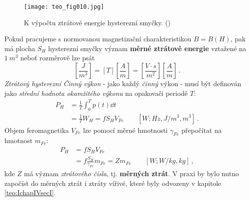       \begin{figure}[ht!] %
        \centering
        \texttt{[image: teo\_fig010.jpg]}
        \caption{K výpočtu ztrátové energie hysterezní smyčky.
                 (\cite[s.~159]{Patocka4})}
        \label{teo:fig010}
      \end{figure}
      
      Pokud pracujeme s normovanou magnetizační charakteristikou \(B = B(H)\), pak má plocha 
      \(S_H\) hysterezní smyčky význam \textbf{měrné ztrátově energie} vztažené na \(\qty{1}{m^3}\) 
      neboť rozměrově lze psát
      \begin{equation*}
        \left[\frac{J}{m^3}\right] = [T]\left[\frac{A}{m}\right] 
                                   = \left[\frac{V\cdot s}{m^2}\right]\left[\frac{A}{m}\right] \,.
      \end{equation*}
      \emph{Ztrátový hysterezní Činný výkon} - jako každý \emph{činný} výkon - musí být definován 
      jako \emph{střední hodnota okamžitého výkonu} na opakovači periodě \(T\): 
      \begin{align}\label{TEO:eq041}
        P_H &= \frac{1}{T}\int_0^Tp(t)\dd{t}          \nonumber \\
            &= \frac{1}{T}W_H = fS_HV_{Fe}
               \qquad[W;Hz, J/m^3, m^3]\,.
      \end{align}
      Objem feromagnetika \(V_{Fe}\) lze pomocí měrné hmotnosti \(\gamma_{Fe}\) přepočítat na 
      hmotnost \(m_{Fe}\): 
      \begin{align}\label{TEO:eq042}
        P_H &= fS_HV_{Fe}                            \nonumber \\
            &= f\frac{S_H}{\gamma_{Fe}}m_{Fe} = Zm_{Fe} 
               \qquad[W; W/kg, kg]\,,
      \end{align}
      kde \(Z\) má význam \emph{ztrátového čísla}, tj. \textbf{měrných ztrát}. V praxi by bylo 
      nutno započíst do měrných ztrát i ztráty vířivé, které byly odvozeny v kapitole 
      \ref{teo:IchapIVsecI}.
      
